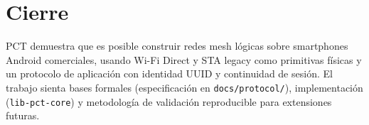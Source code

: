 \section{Cierre}
\label{sec:cierre}

PCT demuestra que es posible construir redes mesh lógicas sobre smartphones Android comerciales, usando Wi-Fi Direct y STA legacy como primitivas físicas y un protocolo de aplicación con identidad UUID y continuidad de sesión. El trabajo sienta bases formales (especificación en \texttt{docs/protocol/}), implementación (\texttt{lib-pct-core}) y metodología de validación reproducible para extensiones futuras.
